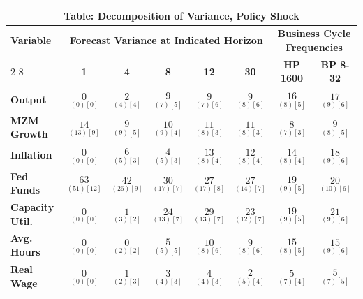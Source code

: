 \documentclass{article}
\begin{document}
 \begin{tabular}{|l|c|@{}c|c|@{}c|c|@{}c|c|} 
 \hline 
 \multicolumn{8}{|c|}{\textbf{Table: Decomposition of Variance, Policy Shock}} \\ \hline 
 \textbf{Variable} & \multicolumn{5}{|c}{\textbf{Forecast Variance at 
 Indicated Horizon}} & \multicolumn{2}{|c|}{\textbf{Business Cycle 
 Frequencies}} \\ \cline{2-8} 
 & \textbf{1} & \textbf{4} & \textbf{8} & \textbf{12} & \textbf{30} & \textbf{%
 HP 1600} & \textbf{BP 8-32} \\ \hline\hline 
 \textbf{Output} & $\underset{(  0) [  0]}{  0}$ & $\underset{(  4) [  4]}{  2}$ & $\underset{(  7) [  5]}{  9}$ & $\underset{(  7) [  6]}{  9}$ & $\underset{(  8) [  6]}{  9}$ & $\underset{(  8) [  5]}{ 16}$ & $\underset{(  9) [  6]}{ 17}$ \\ \hline 
 \textbf{MZM Growth} & $\underset{( 13) [  9]}{ 14}$ & $\underset{(  9) [  5]}{  9}$ & $\underset{(  9) [  4]}{ 10}$ & $\underset{(  8) [  3]}{ 11}$ & $\underset{(  8) [  3]}{ 11}$ & $\underset{(  7) [  3]}{  8}$ & $\underset{(  8) [  5]}{  9}$ \\ \hline 
 \textbf{Inflation} & $\underset{(  0) [  0]}{  0}$ & $\underset{(  5) [  3]}{  6}$ & $\underset{(  5) [  3]}{  4}$ & $\underset{(  8) [  4]}{ 13}$ & $\underset{(  8) [  4]}{ 12}$ & $\underset{(  8) [  4]}{ 14}$ & $\underset{(  9) [  6]}{ 18}$ \\ \hline 
 \textbf{Fed Funds} & $\underset{( 51) [ 12]}{ 63}$ & $\underset{( 26) [  9]}{ 42}$ & $\underset{( 17) [  7]}{ 30}$ & $\underset{( 17) [  8]}{ 27}$ & $\underset{( 14) [  7]}{ 27}$ & $\underset{(  9) [  5]}{ 19}$ & $\underset{( 10) [  6]}{ 20}$ \\ \hline 
 \textbf{Capacity Util.} & $\underset{(  0) [  0]}{  0}$ & $\underset{(  3) [  2]}{  1}$ & $\underset{( 13) [  7]}{ 24}$ & $\underset{( 13) [  7]}{ 29}$ & $\underset{( 12) [  7]}{ 23}$ & $\underset{(  9) [  5]}{ 19}$ & $\underset{(  9) [  6]}{ 21}$ \\ \hline 
 \textbf{Avg. Hours} & $\underset{(  0) [  0]}{  0}$ & $\underset{(  2) [  2]}{  0}$ & $\underset{(  5) [  5]}{  5}$ & $\underset{(  8) [  6]}{ 10}$ & $\underset{(  8) [  6]}{  9}$ & $\underset{(  8) [  5]}{ 15}$ & $\underset{(  9) [  6]}{ 15}$ \\ \hline 
 \textbf{Real Wage} &  $\underset{(  0) [  0]}{  0}$ & $\underset{(  2) [  3]}{  1}$ & $\underset{(  4) [  3]}{  3}$ & $\underset{(  4) [  3]}{  4}$ & $\underset{(  5) [  4]}{  2}$ & $\underset{(  7) [  4]}{  5}$ & $\underset{(  7) [  5]}{  5}$ \\ \hline 

\end{tabular}
\end{document}
